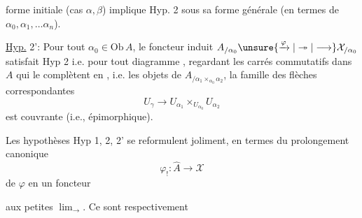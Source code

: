 
forme initiale (cas $\alpha,\beta$) implique Hyp. 2 sous sa forme générale (en termes de $\alpha_0,\alpha_1,\ldots\alpha_n$).

\uline{Hyp.} 2': Pour tout $\alpha_0\in\mathrm{Ob}\,A$, le foncteur induit $A_{/\alpha_0}\unsure{\xrightarrow{\varphi}|\twoheadrightarrow|\longrightarrow}\mathcal X_{/\alpha_0}$ satisfait  Hyp 2 i.e. pour tout diagramme
, regardant les carrés commutatifs dans $A$ qui le complètent en
, i.e. les objets de $A_{/\alpha_1\times_{\alpha_0}\alpha_2}$, la famille des flèches correspondantes
\[U_\gamma\longrightarrow U_{\alpha_1}\times_{U_{\alpha_0}}U_{\alpha_2}\]
est couvrante (i.e., épimorphique).

Les hypothèses Hyp 1, 2, 2' se reformulent joliment, en termes du prolongement canonique
\[\varphi_!:\widehat A\longrightarrow\mathcal X\]
de $\varphi$ en un foncteur   aux petites $\lim_{\longrightarrow}$. Ce sont respectivement
